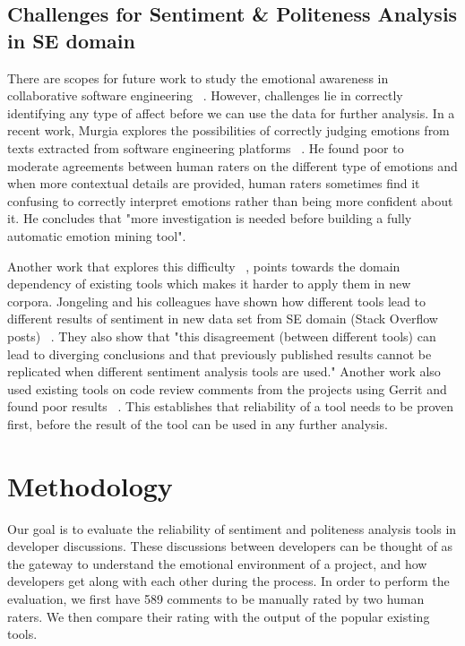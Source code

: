 \subsection{Challenges for Sentiment \& Politeness Analysis in SE domain}

There are scopes for future work to study the emotional awareness in collaborative software engineering ~\cite{dewan2015towards}. However, challenges lie in correctly identifying any type of affect before we can use the data for further analysis. In a recent work, Murgia explores the possibilities of correctly judging emotions from texts extracted from software engineering platforms ~\cite{murgia2014developers}. He found poor to moderate agreements between human raters on the different type of emotions and when more contextual details are provided, human raters sometimes find it confusing to correctly interpret emotions rather than being more confident about it. He concludes that "more investigation is needed before building a fully automatic emotion mining tool".

Another work that explores this difficulty ~\cite{novielli2015challenges}, points towards the domain dependency of existing tools which makes it harder to apply them in new corpora. Jongeling and his colleagues have shown how different tools lead to different results of sentiment in new data set from SE domain (Stack Overflow posts) ~\cite{jongeling2017negative}. They also show that "this disagreement (between different tools) can lead to diverging conclusions and that previously published results cannot be replicated when different sentiment analysis tools are used." Another work also used existing tools on code review comments from the projects using Gerrit and found poor results ~\cite{ahmed2017senticr}. This establishes that reliability of a tool needs to be proven first, before the result of the tool can be used in any further analysis.
   

\section{Methodology}

Our goal is to evaluate the reliability of sentiment and politeness analysis tools in developer discussions.
These discussions between developers can be thought of as the gateway to understand the emotional environment of a project, and how developers get along with each other during the process. 
In order to perform the evaluation, we first have 589 comments to be manually rated by two human raters. 
We then compare their rating with the output of the popular existing tools. 

